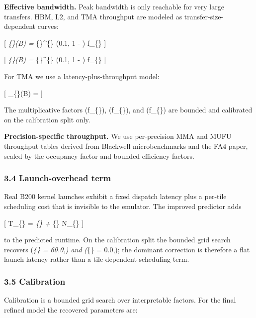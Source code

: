 \textbf{Effective bandwidth.} Peak bandwidth is only reachable for very
large transfers. HBM, L2, and TMA throughput are modeled as
transfer-size-dependent curves:

{[} \beta\emph{\{\}(B) =
\beta}\{\}\^{}\{\} \cdot \max(0.1, 1 -
) \cdot f\_\{\} {]}

{[} \beta\emph{\{\}(B) = \beta}\{\}\^{}\{\}
\cdot \max(0.1, 1 - ) \cdot f\_\{\} {]}

For TMA we use a latency-plus-throughput model:

{[} \beta\_\{\}(B) =
{]}

The multiplicative factors (f\_\{\}), (f\_\{\}), and
(f\_\{\}) are bounded and calibrated on the calibration split
only.

\textbf{Precision-specific throughput.} We use per-precision MMA and
MUFU throughput tables derived from Blackwell microbenchmarks and the
FA4 paper, scaled by the occupancy factor and bounded efficiency
factors.

\subsubsection{3.4 Launch-overhead term}\label{launch-overhead-term}

Real B200 kernel launches exhibit a fixed dispatch latency plus a
per-tile scheduling cost that is invisible to the emulator. The improved
predictor adds

{[} T\_\{\} = \tau\emph{\{\} +
\tau}\{\} \cdot N\_\{\} {]}

to the predicted runtime. On the calibration split the bounded grid
search recovers (\tau\emph{\{\} = 60.0,\mu{}) and
(\tau}\{\} = 0.0,\mu{}); the dominant correction is
therefore a flat launch latency rather than a tile-dependent scheduling
term.

\subsubsection{3.5 Calibration}\label{calibration}

Calibration is a bounded grid search over interpretable factors. For the
final refined model the recovered parameters are:

